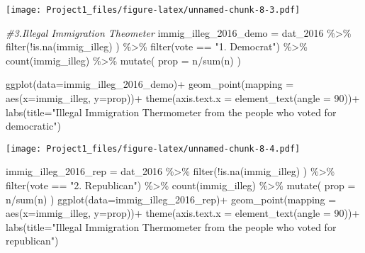 \documentclass[
]{article}
\newenvironment{Shaded}{\begin{snugshade}}{\end{snugshade}}
\newcommand{\AttributeTok}[1]{\textcolor[rgb]{0.77,0.63,0.00}{#1}}
\newcommand{\CommentTok}[1]{\textcolor[rgb]{0.56,0.35,0.01}{\textit{#1}}}
\newcommand{\DecValTok}[1]{\textcolor[rgb]{0.00,0.00,0.81}{#1}}
\newcommand{\FunctionTok}[1]{\textcolor[rgb]{0.00,0.00,0.00}{#1}}
\newcommand{\NormalTok}[1]{#1}
\newcommand{\OtherTok}[1]{\textcolor[rgb]{0.56,0.35,0.01}{#1}}
\newcommand{\SpecialCharTok}[1]{\textcolor[rgb]{0.00,0.00,0.00}{#1}}
\newcommand{\StringTok}[1]{\textcolor[rgb]{0.31,0.60,0.02}{#1}}
\begin{document}
\texttt{[image: Project1\_files/figure-latex/unnamed-chunk-8-3.pdf]}

\begin{Shaded}
\begin{Highlighting}[]
\CommentTok{\#3.Illegal Immigration Theometer}
\NormalTok{immig\_illeg\_2016\_demo }\OtherTok{=}\NormalTok{ dat\_2016 }\SpecialCharTok{\%\textgreater{}\%}
  \FunctionTok{filter}\NormalTok{(}\SpecialCharTok{!}\FunctionTok{is.na}\NormalTok{(immig\_illeg) ) }\SpecialCharTok{\%\textgreater{}\%}
  \FunctionTok{filter}\NormalTok{(vote }\SpecialCharTok{==} \StringTok{"1. Democrat"}\NormalTok{) }\SpecialCharTok{\%\textgreater{}\%}
  \FunctionTok{count}\NormalTok{(immig\_illeg) }\SpecialCharTok{\%\textgreater{}\%}
  \FunctionTok{mutate}\NormalTok{(}
    \AttributeTok{prop =}\NormalTok{ n}\SpecialCharTok{/}\FunctionTok{sum}\NormalTok{(n)}
\NormalTok{  )}

\FunctionTok{ggplot}\NormalTok{(}\AttributeTok{data=}\NormalTok{immig\_illeg\_2016\_demo)}\SpecialCharTok{+}
  \FunctionTok{geom\_point}\NormalTok{(}\AttributeTok{mapping =} \FunctionTok{aes}\NormalTok{(}\AttributeTok{x=}\NormalTok{immig\_illeg, }\AttributeTok{y=}\NormalTok{prop))}\SpecialCharTok{+}
  \FunctionTok{theme}\NormalTok{(}\AttributeTok{axis.text.x =} \FunctionTok{element\_text}\NormalTok{(}\AttributeTok{angle =} \DecValTok{90}\NormalTok{))}\SpecialCharTok{+}
  \FunctionTok{labs}\NormalTok{(}\AttributeTok{title=}\StringTok{"Illegal Immigration Thermometer from the people who voted for democratic"}\NormalTok{)}
\end{Highlighting}
\end{Shaded}

\texttt{[image: Project1\_files/figure-latex/unnamed-chunk-8-4.pdf]}

\begin{Shaded}
\begin{Highlighting}[]
\NormalTok{immig\_illeg\_2016\_rep }\OtherTok{=}\NormalTok{ dat\_2016 }\SpecialCharTok{\%\textgreater{}\%}
  \FunctionTok{filter}\NormalTok{(}\SpecialCharTok{!}\FunctionTok{is.na}\NormalTok{(immig\_illeg) ) }\SpecialCharTok{\%\textgreater{}\%}
  \FunctionTok{filter}\NormalTok{(vote }\SpecialCharTok{==} \StringTok{"2. Republican"}\NormalTok{) }\SpecialCharTok{\%\textgreater{}\%}
  \FunctionTok{count}\NormalTok{(immig\_illeg) }\SpecialCharTok{\%\textgreater{}\%}
  \FunctionTok{mutate}\NormalTok{(}
    \AttributeTok{prop =}\NormalTok{ n}\SpecialCharTok{/}\FunctionTok{sum}\NormalTok{(n)}
\NormalTok{  )}
\FunctionTok{ggplot}\NormalTok{(}\AttributeTok{data=}\NormalTok{immig\_illeg\_2016\_rep)}\SpecialCharTok{+}
\FunctionTok{geom\_point}\NormalTok{(}\AttributeTok{mapping =} \FunctionTok{aes}\NormalTok{(}\AttributeTok{x=}\NormalTok{immig\_illeg, }\AttributeTok{y=}\NormalTok{prop))}\SpecialCharTok{+}
\FunctionTok{theme}\NormalTok{(}\AttributeTok{axis.text.x =} \FunctionTok{element\_text}\NormalTok{(}\AttributeTok{angle =} \DecValTok{90}\NormalTok{))}\SpecialCharTok{+}
  \FunctionTok{labs}\NormalTok{(}\AttributeTok{title=}\StringTok{"Illegal Immigration Thermometer from the people who voted for republican"}\NormalTok{)}
\end{Highlighting}
\end{Shaded}
\end{document}
